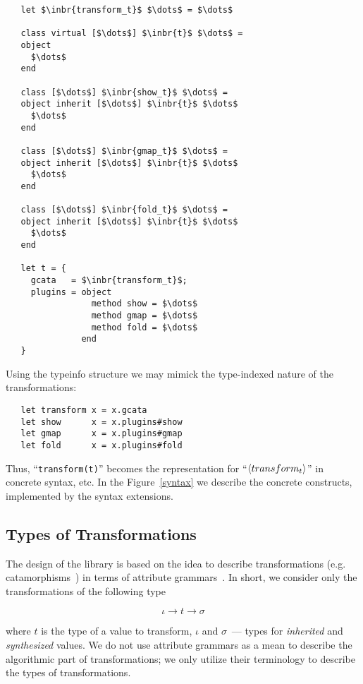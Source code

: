 \begin{lstlisting}
   let $\inbr{transform_t}$ $\dots$ = $\dots$
   
   class virtual [$\dots$] $\inbr{t}$ $\dots$ =
   object
     $\dots$
   end

   class [$\dots$] $\inbr{show_t}$ $\dots$ =
   object inherit [$\dots$] $\inbr{t}$ $\dots$
     $\dots$
   end

   class [$\dots$] $\inbr{gmap_t}$ $\dots$ =
   object inherit [$\dots$] $\inbr{t}$ $\dots$
     $\dots$
   end

   class [$\dots$] $\inbr{fold_t}$ $\dots$ =
   object inherit [$\dots$] $\inbr{t}$ $\dots$
     $\dots$
   end

   let t = {
     gcata   = $\inbr{transform_t}$;
     plugins = object
                 method show = $\dots$
                 method gmap = $\dots$
                 method fold = $\dots$
               end
   }
\end{lstlisting}

Using the typeinfo structure we may mimick the type-indexed nature of the transformations:

\begin{lstlisting}
   let transform x = x.gcata
   let show      x = x.plugins#show
   let gmap      x = x.plugins#gmap
   let fold      x = x.plugins#fold
\end{lstlisting}

Thus, ``\lstinline{transform(t)}'' becomes the representation for ``$\left<transform_t\right>$'' in concrete syntax, etc. In the
Figure~\ref{syntax} we describe the concrete constructs, implemented by the syntax extensions.

\subsection{Types of Transformations}

The design of the library is based on the idea to describe transformations (e.g. catamorphisms~\cite{Bananas}) in terms of attribute grammars~\cite{AGKnuth,AGSwierstra,ObjectAlgebrasAttribute}.
In short, we consider only the transformations of the following type

\[
\iota \to t \to \sigma
\]

where $t$ is the type of a value to transform, $\iota$ and $\sigma$~--- types for \emph{inherited} and \emph{synthesized} values. We do not use attribute
grammars as a mean to describe the algorithmic part of transformations; we only utilize their terminology to describe the types of transformations. 

